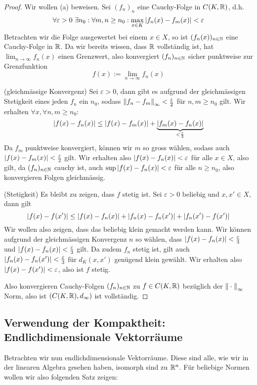 \begin{proof} Wir wollen (a) beweisen. Sei $(f_n)_n$ eine Cauchy-Folge in $C(K, \mathbb{R})$, d.h.
$$\forall \varepsilon > 0 \ \exists n_0: \forall m,n\geq n_0: \max_{x \in K}\left|f_n(x)-f_m(x)\right| < \varepsilon$$
Betrachten wir die Folge ausgewertet bei einem $x \in X$, so ist $(f_n(x))_{n \in \mathbb{N}}$ eine Cauchy-Folge in $\mathbb{R}$. Da wir bereits wissen, dass $\mathbb{R}$ vollständig ist, hat $\lim_{n\to \infty}f_n(x)$ einen Grenzwert, also konvergiert $(f_n)_{n \in \mathbb{N}}$ sicher punktweise zur Grenzfunktion
$$f(x) := \lim_{n \to \infty} f_n(x)$$

(gleichmässige Konvergenz) Sei $\varepsilon > 0$, dann gibt es aufgrund der gleichmässigen Stetigkeit eines jeden $f_n$ ein $n_0$, sodass $\left\|f_n-f_m\right\|_\infty < \frac{\varepsilon}{2}$ für $n,m \geq n_0$ gilt. Wir erhalten $\forall x, \forall n,m \geq n_0$:
$$\left|f(x) - f_n(x)\right| \leq \left|f(x) - f_m(x)\right| + \underbrace{\left|f_m(x) - f_n(x)\right|}_{< \frac{\varepsilon}{2}}$$
Da $f_m$ punktweise konvergiert, können wir $m$ so gross wählen, sodass auch $\left|f(x) - f_m(x)\right| < \frac{\varepsilon}{2}$ gilt. Wir erhalten also  $\left|f(x) - f_n(x)\right|<\varepsilon$ für alle $x \in X$, also gilt, da $(f_n)_{n \in \mathbb{N}}$ cauchy ist, auch $\sup \left|f(x) - f_n(x)\right| < \varepsilon$ für alle $n \geq n_0$, also konvergieren Folgen gleichmässig.

(Stetigkeit) Es bleibt zu zeigen, dass $f$ stetig ist. Sei $\varepsilon > 0$ beliebig und $x, x' \in X$, dann gilt
$$\left|f(x) -f(x')\right| \leq \left|f(x) -f_n(x)\right| + \left|f_n(x) - f_n(x')\right| + \left|f_n(x') - f(x')\right|$$
Wir wollen also zeigen, dass das beliebig klein gemacht werden kann. Wir können aufgrund der gleichmässigen Konvergenz $n$ so wählen, dass $\left|f(x) -f_n(x)\right| < \frac{\varepsilon}{3}$ und $\left|f(x) -f_n(x)\right| < \frac{\varepsilon}{3}$ gilt. Da zudem $f_n$ stetig ist, gilt auch $\left|f_n(x) - f_n(x')\right| < \frac{\varepsilon}{3}$ für $d_K(x, x')$ genügend klein gewählt. Wir erhalten also $\left|f(x) -f(x')\right| < \varepsilon$, also ist $f$ stetig.

Also konvergieren Cauchy-Folgen $(f_n)_{n \in \mathbb{N}}$ zu $f \in C(K, \mathbb{R})$ bezüglich der $\left\|\:\cdot\:\right\|_\infty$ Norm, also ist $\left(C(K, \mathbb{R}), d_\infty\right)$ ist vollständig.
\end{proof}

\subsection{Verwendung der Kompaktheit: Endlichdimensionale Vektorräume}
Betrachten wir nun endlichdimensionale Vektorräume. Diese sind alle, wie wir in der linearen Algebra gesehen haben, isomorph sind zu $\mathbb{R}^n$. Für beliebige Normen wollen wir also folgenden Satz zeigen:

